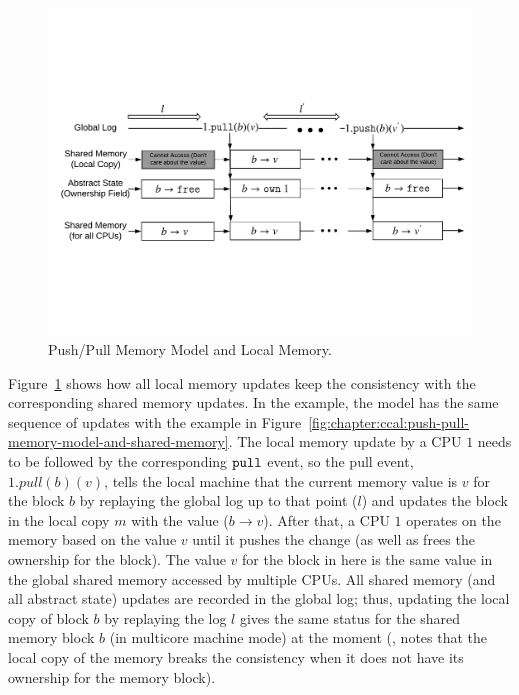 \begin{figure}
\includegraphics[width=\textwidth]{figs/ccal/pushpullsharedmemorylocal}
\caption{Push/Pull Memory Model and Local Memory.}
\label{fig:chapter:ccal:push-pull-memory-model-and-local-memory}
\end{figure}

Figure~\ref{fig:chapter:ccal:push-pull-memory-model-and-local-memory} shows how
all local memory updates keep the consistency with the corresponding shared memory updates. 
In the example, the model has the same sequence of updates with the example 
in Figure~\ref{fig:chapter:ccal:push-pull-memory-model-and-shared-memory}.
The local memory update by a CPU $1$ needs to be followed by the corresponding ${\mathrm{\texttt{pull}}}$ event, 
so the pull event, $1.pull(b)(v)$, tells the local machine that the current memory value is 
$v$ for the block $b$ by replaying the global log up to that point ($l$)
and updates the block in the local copy $m$ with the value ($b \rightarrow v$). 
After that, a CPU $1$ operates on the memory based on the value $v$ until it pushes the change (as well as frees the ownership for the block).
The value $v$ for the block in here is the same value in the global shared memory accessed by multiple CPUs. 
All shared memory (and all abstract state) updates are recorded in the global log; thus,
updating the local copy of block $b$ by replaying the log $l$ gives the same status for the shared memory block $b$ (in multicore machine mode) at the moment
(\ie, notes that the local copy of the memory breaks the consistency when it does not have its ownership for the memory block). 

